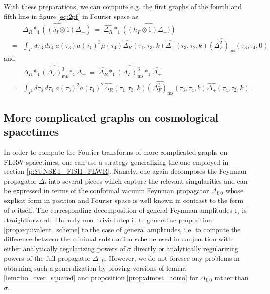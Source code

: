 \documentclass[11pt]{book}
\newcommand{\ms}{\mathsf{ms}}
\newcommand{\fsf}{\mathsf{f}}
\newcommand{\tsf}{\mathsf{t}}
\theoremstyle{break}
\begin{document}
With these preparations, we can compute e.g. the first graphs of the fourth and fifth line in figure \eqref{eq:2pf} in Fourier space as
%
\begin{eqnarray*}
&& \widehat{\Delta_R\ast_4((h_\fsf \otimes 1) \Delta_+)} \ = \ \widehat{\Delta_R}\ast_1\widehat{\left((h_F\otimes 1)\Delta_+)\right)} \\
&=& \int_{I^2} d\tau_3\,d\tau_4\; a(\tau_3)a(\tau_4)^3\mu(\tau_4)\widehat{\Delta_R}(\tau_1,\tau_3,k)\widehat{\Delta_+}(\tau_3,\tau_2,k)\widehat{(\Delta^2_F)_\text{ms}}(\tau_3,\tau_4,0)
\end{eqnarray*}
%
and
%
\begin{eqnarray*}
&& \widehat{\Delta_R\ast_4(\Delta_F)^3_\ms\ast_4\Delta_+} \ = \ \widehat{\Delta_R}\ast_1\widehat{(\Delta_F)^3_\text{ms}}\ast_1\widehat{\Delta_+} \\
&=& \int_{I^2} d\tau_3\,d\tau_4\; a(\tau_3)^2a(\tau_4)^2\widehat{\Delta_R}(\tau_1,\tau_3,k)\widehat{(\Delta^3_F)_\text{ms}}(\tau_3,\tau_4,k)\widehat{\Delta_+}(\tau_4,\tau_2,k) \ .
\end{eqnarray*}


\subsection{More complicated graphs on cosmological spacetimes}


In order to compute the Fourier transforms of more complicated graphs on FLRW spacetimes, one can use a strategy generalizing the one employed in section \ref{p:SUNSET_FISH_FLWR}. Namely, one again decomposes the Feynman propagator $\Delta_\fsf$ into several pieces which capture the relevant singularities and can be expressed in terms of the conformal vacuum Feynman propagator $\Delta_{\fsf,0}$ whose explicit form in position and Fourier space is well known in contrast to the form of $\sigma$ itself. The corresponding decomposition of general Feynman amplitudes $\tsf_\gamma$ is straightforward. The only non--trivial step is to generalize proposition \ref{prop:equivalent_scheme} to the case of general amplitudes, i.e. to compute the difference between the minimal subtraction scheme used in conjunction with either analytically regularizing powers of $\sigma$ directly or analytically regularizing powers of the full propagator $\Delta_{\fsf,0}$. However, we do not foresee any problems in obtaining such a generalization by proving versions of lemma \ref{lem:rho_over_squared} and proposition \ref{prop:almost_homo} for $\Delta_{\fsf,0}$ rather than $\sigma$.
\end{document}
